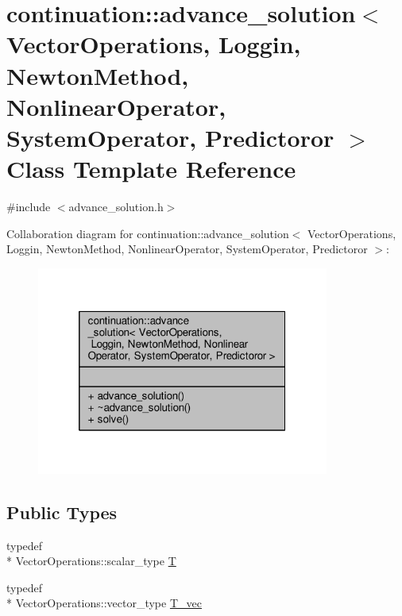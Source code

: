 \hypertarget{classcontinuation_1_1advance__solution}{\section{continuation\-:\-:advance\-\_\-solution$<$ Vector\-Operations, Loggin, Newton\-Method, Nonlinear\-Operator, System\-Operator, Predictoror $>$ Class Template Reference}
\label{classcontinuation_1_1advance__solution}
}


{\ttfamily \#include $<$advance\-\_\-solution.\-h$>$}



Collaboration diagram for continuation\-:\-:advance\-\_\-solution$<$ Vector\-Operations, Loggin, Newton\-Method, Nonlinear\-Operator, System\-Operator, Predictoror $>$\-:\nopagebreak
\begin{figure}[H]
\begin{center}
\leavevmode
\includegraphics[width=272pt]{classcontinuation_1_1advance__solution__coll__graph}
\end{center}
\end{figure}
\subsection*{Public Types}
\begin{DoxyCompactItemize}
\item 
typedef \\*
Vector\-Operations\-::scalar\-\_\-type \hyperlink{classcontinuation_1_1advance__solution_a525792bcc16846c5ba10f15400d53fed}{T}
\item 
typedef \\*
Vector\-Operations\-::vector\-\_\-type \hyperlink{classcontinuation_1_1advance__solution_a2c54f76f6415c6d28af4c97f7d6fe605}{T\-\_\-vec}
\end{DoxyCompactItemize}
